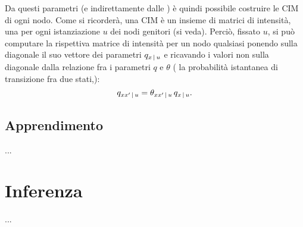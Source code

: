 Da questi parametri (e indirettamente dalle \stats{}) è quindi possibile costruire le \acl{CIM} di ogni nodo. Come si ricorderà, una \acs{CIM} è un insieme di matrici di intensità, una per ogni istanziazione $u$ dei nodi genitori (si veda). Perciò, fissato $u$, si può computare la rispettiva matrice di intensità per un nodo qualsiasi ponendo sulla diagonale il suo vettore dei parametri $q_{x\,\arrowvert\,u}$ e ricavando i valori non sulla diagonale dalla relazione fra i parametri $q$ e $\theta$ (\ie{} la probabilità istantanea di transizione fra due stati,):
\[
q_{xx^\prime\,\arrowvert\,u}=\theta_{xx^\prime\,\arrowvert\,u}\,q_{x\,\arrowvert\,u}\text{.}
\]

\subsection{Apprendimento}
\label{sec:ctbn-learning}
...

\section{Inferenza}
\label{sec:ctbn-inferenza}
...









